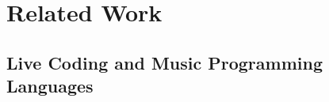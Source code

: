\chapter{Related Work}\label{ch:related-work}


\section{Live Coding and Music Programming Languages}\label{sec:live-coding-and-music-programming-languages}



